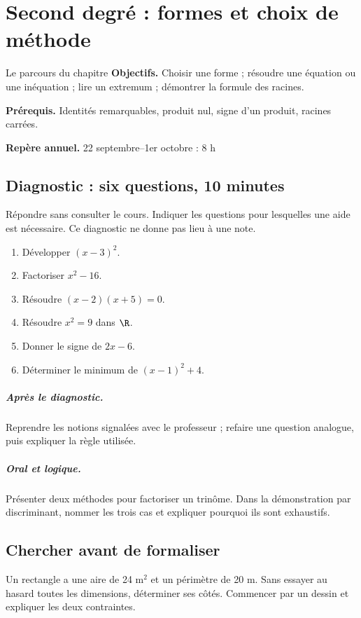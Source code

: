 \chapter{Second degré : formes et choix de méthode}\label{C02}
\begin{repere}{Le parcours du chapitre}
\textbf{Objectifs.} Choisir une forme ; résoudre une équation ou une inéquation ; lire un extremum ; démontrer la formule des racines.

\textbf{Prérequis.} Identités remarquables, produit nul, signe d’un produit, racines carrées.

\textbf{Repère annuel.} 22 septembre–1er octobre : 8 h\end{repere}
\section*{Diagnostic : six questions, 10 minutes}\label{C02-D}
Répondre sans consulter le cours. Indiquer les questions pour lesquelles une aide est nécessaire. Ce diagnostic ne donne pas lieu à une note.
\begin{enumerate}
\item Développer $(x-3)^2$.
\item Factoriser $x^2-16$.
\item Résoudre $(x-2)(x+5)=0$.
\item Résoudre $x^2=9$ dans $\R$.
\item Donner le signe de $2x-6$.
\item Déterminer le minimum de $(x-1)^2+4$.
\end{enumerate}
\paragraph{Après le diagnostic.} Reprendre les notions signalées avec le professeur ; refaire une question analogue, puis expliquer la règle utilisée.
\paragraph{Oral et logique.} Présenter deux méthodes pour factoriser un trinôme. Dans la démonstration par discriminant, nommer les trois cas et expliquer pourquoi ils sont exhaustifs.
\clearpage
\section*{Chercher avant de formaliser}\label{C02-RECH}
Un rectangle a une aire de 24 m$^2$ et un périmètre de 20 m. Sans essayer au hasard toutes les dimensions, déterminer ses côtés. Commencer par un dessin et expliquer les deux contraintes.
